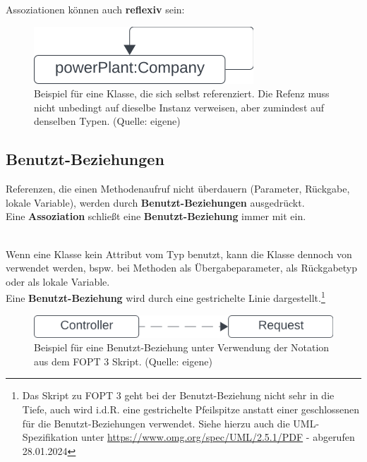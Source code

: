 \noindent
Assoziationen können auch \textbf{reflexiv} sein:


\begin{figure}
    \centering
    \includegraphics[scale=0.5]{chapters/fopt3/img/reflexive}
    \caption{Beispiel für eine Klasse, die sich selbst referenziert. Die Refenz muss nicht unbedingt auf dieselbe Instanz verweisen, aber zumindest auf denselben Typen. (Quelle: eigene)}
    \label{fig:reflexive}
\end{figure}

\newpage
\subsection{Benutzt-Beziehungen}

\begin{tcolorbox}[enlarge top by=0.5cm,enlarge bottom by=0.5cm]
    Referenzen, die einen Methodenaufruf nicht überdauern (Parameter, Rückgabe, lokale Variable), werden durch \textbf{Benutzt-Beziehungen} ausgedrückt.\\

    \noindent
    Eine \textbf{Assoziation} schließt eine \textbf{Benutzt-Beziehung} immer mit ein.
\end{tcolorbox}\\

\noindent
Wenn eine Klasse  kein Attribut vom Typ  benutzt, kann die Klasse  dennoch von  verwendet werden, bspw. bei Methoden als Übergabeparameter, als Rückgabetyp oder als lokale Variable.\\

\noindent
Eine \textbf{Benutzt-Beziehung} wird durch eine gestrichelte Linie dargestellt.\footnote{
Das Skript zu FOPT 3 geht bei der Benutzt-Beziehung nicht sehr in die Tiefe, auch wird i.d.R. eine gestrichelte Pfeilspitze anstatt einer geschlossenen für die Benutzt-Beziehungen verwendet. Siehe hierzu auch die UML-Spezifikation unter \url{https://www.omg.org/spec/UML/2.5.1/PDF} - abgerufen 28.01.2024
}


\begin{figure}
    \centering
    \includegraphics[scale=0.5]{chapters/fopt3/img/uses}
    \caption{Beispiel für eine Benutzt-Beziehung unter Verwendung der Notation aus dem FOPT 3 Skript. (Quelle: eigene)}
    \label{fig:uses}
\end{figure}

